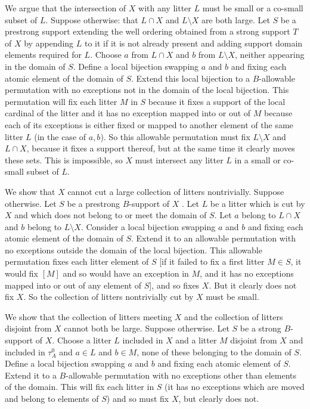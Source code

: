 \documentclass[12pt]{article}
\begin{document}
We argue that the intersection of $X$ with any litter $L$ must be small or a co-small subset of $L$.  Suppose otherwise:  that $L \cap X$ and $L \setminus X$ are both large.
Let $S$ be a prestrong support extending the well ordering obtained from a strong support $T$ of $X$ by appending $L$ to it if it is not already present and adding support domain elements required for $L$. 
 Choose $a$ from $L \cap X$ and $b$ from $L \setminus X$, neither appearing in the domain of $S$.  Define a local bijection swapping $a$ and $b$ and fixing each atomic element of the domain of $S$.  Extend this local bijection to
a $B$-allowable permutation with no exceptions not in the domain of the local bijection.  This permutation will fix each litter $M$ in $S$ because it fixes a support of the local cardinal of the litter
and it has no exception mapped into or out of $M$ because each of its exceptions is either fixed or mapped to another element of the same litter $L$ (in the case of $a,b$).
So this allowable permutation must fix $L \setminus X$ and $L \cap X$, because it fixes a support thereof, but at the same time it clearly moves these sets.  This is impossible,
so $X$ must intersect any litter $L$ in a small or co-small subset of $L$.

We show that $X$ cannot cut a large collection of litters nontrivially.  Suppose otherwise.  Let $S$ be a prestrong $B$-support of $X$ .  Let $L$ be a litter which is cut by $X$
and which does not belong to or meet the domain of $S$.  Let $a$ belong to $L \cap X$ and $b$ belong to $L \setminus X$.  Consider a local bijection swapping $a$ and $b$ and fixing each atomic element of the domain of $S$.  Extend it to an allowable permutation with no exceptions outside the domain of the local bijection.  This allowable permutation fixes each litter
element of $S$ [if it failed to fix a first litter $M\in S$, it would fix $[M]$ and so would have an exception in $M$, and it has no exceptions mapped into or out of any element of $S$], and so fixes $X$.  But it clearly does not fix $X$.  So the collection of litters nontrivially cut by $X$ must be small.

We show that the collection of litters meeting $X$ and the collection of litters disjoint from $X$ cannot both be large.  Suppose otherwise.  Let $S$ be a strong $B$-support of $X$.
Choose a litter $L$ included in $X$ and a litter $M$ disjoint from $X$ and included in $\tau^0_A$  and $a \in L$ and $b \in M$, none of these belonging to the domain of $S$.  Define a local bijection swapping $a$ and $b$ and fixing each atomic element of $S$.  Extend it to a $B$-allowable permutation with no exceptions other than elements of the domain.  This will fix
each litter in $S$ (it has no exceptions which are moved and belong to elements of $S$) and so must fix $X$, but clearly does not.
\end{document}
